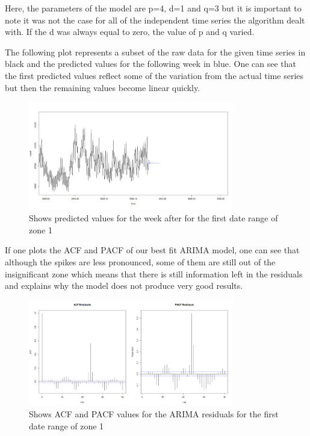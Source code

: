\documentclass{article} %
\begin{document}
Here, the parameters of the model are p=4, d=1 and q=3 but it is important to note it was not the case for all of the independent time series the algorithm dealt with. If the d was always equal to zero, the value of p and q varied. 

The following plot represents a subset of the raw data for the given time series in black and the predicted values for the following week in blue. One can see that the first predicted values reflect some of the variation from the actual time series but then the remaining values become linear quickly.

\begin{figure}
  \centering
    \includegraphics[width=0.80\textwidth]{LoadsPred}
  \caption{Shows predicted values for the week after for the first date range of zone 1 }
\end{figure}

If one plots the ACF and PACF of our best fit ARIMA model, one can see that although the spikes are less pronounced, some of them are still out of the insignificant zone which means that there is still information left in the residuals and explains why the model does not produce very good results.

\begin{figure}
  \centering
    \includegraphics[width=0.80\textwidth]{ACFandPACFLoadsArimaResults}
  \caption{Shows ACF and PACF values for the ARIMA residuals for the first date range of zone 1 }
\end{figure}
\end{document}
